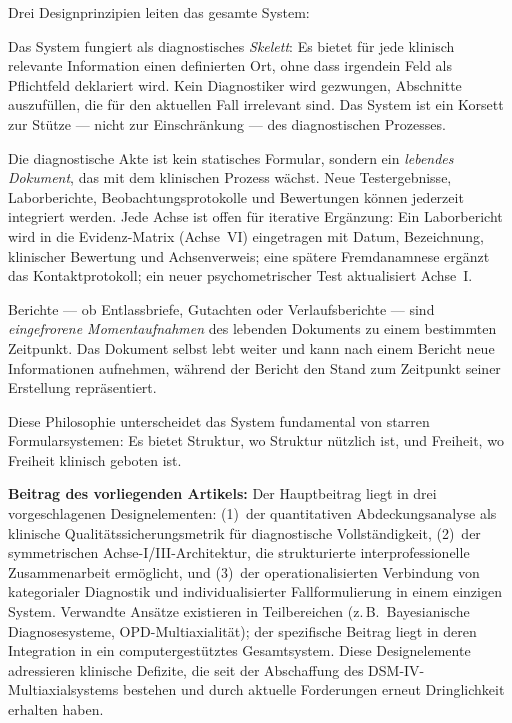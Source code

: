 \documentclass[11pt,a4paper]{article}
\begin{document}
Drei Designprinzipien leiten das gesamte System:

\begin{description}[style=nextline, leftmargin=1.5cm, font=\bfseries]
\item[Skelett-Prinzip] Das System fungiert als diagnostisches \textit{Skelett}: Es bietet f\"ur jede klinisch relevante Information einen definierten Ort, ohne dass irgendein Feld als Pflichtfeld deklariert wird. Kein Diagnostiker wird gezwungen, Abschnitte auszuf\"ullen, die f\"ur den aktuellen Fall irrelevant sind. Das System ist ein Korsett zur St\"utze --- nicht zur Einschr\"ankung --- des diagnostischen Prozesses.
\item[Lebendes Dokument] Die diagnostische Akte ist kein statisches Formular, sondern ein \textit{lebendes Dokument}, das mit dem klinischen Prozess w\"achst. Neue Testergebnisse, Laborberichte, Beobachtungsprotokolle und Bewertungen k\"onnen jederzeit integriert werden. Jede Achse ist offen f\"ur iterative Erg\"anzung: Ein Laborbericht wird in die Evidenz-Matrix (Achse~VI) eingetragen mit Datum, Bezeichnung, klinischer Bewertung und Achsenverweis; eine sp\"atere Fremdanamnese erg\"anzt das Kontaktprotokoll; ein neuer psychometrischer Test aktualisiert Achse~I.
\item[Bericht als Momentaufnahme] Berichte --- ob Entlassbriefe, Gutachten oder Verlaufsberichte --- sind \textit{eingefrorene Momentaufnahmen} des lebenden Dokuments zu einem bestimmten Zeitpunkt. Das Dokument selbst lebt weiter und kann nach einem Bericht neue Informationen aufnehmen, w\"ahrend der Bericht den Stand zum Zeitpunkt seiner Erstellung repr\"asentiert.
\end{description}

Diese Philosophie unterscheidet das System fundamental von starren Formularsystemen: Es bietet Struktur, wo Struktur n\"utzlich ist, und Freiheit, wo Freiheit klinisch geboten ist.

\textbf{Beitrag des vorliegenden Artikels:} Der Hauptbeitrag liegt in drei vorgeschlagenen Designelementen: (1)~der quantitativen Abdeckungsanalyse als klinische Qualit\"atssicherungsmetrik f\"ur diagnostische Vollst\"andigkeit, (2)~der symmetrischen Achse-I/III-Architektur, die strukturierte interprofessionelle Zusammenarbeit erm\"oglicht, und (3)~der operationalisierten Verbindung von kategorialer Diagnostik und individualisierter Fallformulierung in einem einzigen System. Verwandte Ans\"atze existieren in Teilbereichen (z.\,B.\ Bayesianische Diagnosesysteme, OPD-Multiaxialit\"at); der spezifische Beitrag liegt in deren Integration in ein computergest\"utztes Gesamtsystem. Diese Designelemente adressieren klinische Defizite, die seit der Abschaffung des DSM-IV-Multiaxialsystems bestehen und durch aktuelle Forderungen \citep{ErlichFirst2025} erneut Dringlichkeit erhalten haben.
\end{document}
